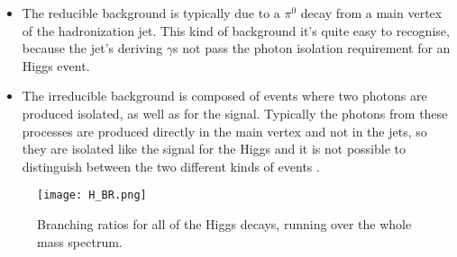 \begin{itemize}
\item The reducible background is typically due to a $\pi^0$ decay from a main vertex of the hadronization jet. This kind of background it's quite easy to recognise, because the jet's deriving $\gamma$s not pass the photon isolation requirement for an Higgs event.
\item The irreducible background is composed of events where two photons are produced isolated, as well as for the signal. Typically the photons from these processes are produced directly in the main vertex and not in the jets, so they are isolated like the signal for the Higgs and it is not possible to distinguish between the two different kinds of events \cite{mass_measurement_ATLAS}.
\end{itemize}
\begin{figure}[htb]
\centering
\texttt{[image: H\_BR.png]}
\caption{Branching ratios for all of the Higgs decays, running over the whole mass spectrum.}
\label{H_BR}
\end{figure} 

